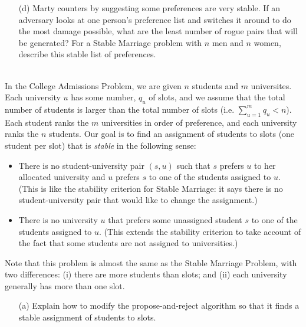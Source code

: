 \documentclass[11pt]{article}
\newif\ifsolutions
\begin{document}
\begin{qunlist}
\begin{itemize}
\ifsolutions
\textbf{Solutions:}
\fi


\item[(d)] Marty counters by suggesting some preferences are very stable. 
If an adversary looks at one person's preference list and switches it around to do the most damage possible, 
what are the least number of rogue pairs that will be generated? 
For a Stable Marriage problem with $n$ men and $n$ women, describe this stable list of preferences.

\ifsolutions
\textbf{Solutions:}
\fi


\end{itemize}




\\
In the College Admissions Problem, we are given $n$ students and $m$ universites. 
Each university $u$ has some number, $q_u$ of slots, 
and we assume that the total number of students is larger than the total number of slots
(i.e. $\sum_{u=1}^m{q_u} < n$). 
Each student ranks the $m$ universities in order of preference, and each university ranks the $n$ students. 
Our goal is to find an assignment of students to slots (one student per slot) that is \textit{stable} 
in the following sense:
\begin{itemize}
\item There is no student-university pair $(s,u)$ such that $s$ prefers $u$ to her allocated university 
and $u$ prefers $s$ to one of the students assigned to $u$. 
(This is like the stability criterion for Stable Marriage: 
it says there is no student-university pair that would like to change the assignment.)
\item There is no university $u$ that prefers some unassigned student $s$ to one of the students assigned to $u$.
(This extends the stability criterion to take account of the fact that 
some students are not assigned to universities.)
\end{itemize}

Note that this problem is almost the same as the Stable Marriage Problem, with two differences:
(i) there are more students than slots; and
(ii) each university generally has more than one slot.
\begin{itemize}
\item[(a)] Explain how to modify the propose-and-reject algorithm so that 
it finds a stable assignment of students to slots.


\end{itemize}
\end{qunlist}
\end{document}
